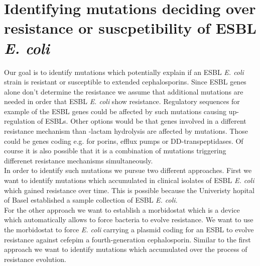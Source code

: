 \section{Identifying mutations deciding over resistance or suscpetibility of ESBL \textit{E. coli}}
Our goal is to identify mutations which potentially explain if an ESBL \textit{E. coli} strain is resistant or susceptible to extended cephalosporins. Since ESBL genes alone don't determine the resistance we assume that additional mutations are needed in order that ESBL \textit{E. coli} show resistance. Regulatory sequences for example of the ESBL genes could be affected by such mutations causing up-regulation of ESBLs. Other options would be that genes involved in a different resistance mechanism than \textbeta-lactam hydrolysis are affected by mutations. Those could be genes coding e.g. for porins, efflux pumps or DD-transpeptidases. Of course it is also possible that it is a combination of mutations triggering differenet resistance mechanisms simultaneously. \\
In order to identify such mutations we pursue two different approaches. First we want to identify mutations which accumulated in clinical isolates of ESBL \textit{E. coli} which gained resistance over time. This is possible because the Univeristy hopital of Basel established a sample collection of ESBL \textit{E. coli}. \\
For the other approach we want to establish a morbidostat which is a device which automatically allows to force bacteria to evolve resistance. We want to use the morbidostat to force \textit{E. coli} carrying a plasmid coding for an ESBL to evolve resistance against cefepim a fourth-generation cephalosporin. Similar to the first approach we want to identify mutations which accumulated over the process of resistance evolution.

